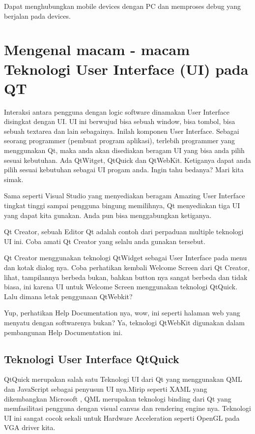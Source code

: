 Dapat menghubungkan mobile devices dengan PC dan memproses debug yang
berjalan pada devices.

\section{Mengenal macam - macam Teknologi User Interface (UI) pada QT}\label{mengenal-macam-macam-teknologi-user-interface-ui-pada-qt}

Interaksi antara pengguna dengan logic software dinamakan User Interface
disingkat dengan UI. UI ini berwujud bisa sebuah window, bisa tombol,
bisa sebuah textarea dan lain sebagainya. Inilah komponen User
Interface. Sebagai seorang programmer (pembuat program aplikasi),
terlebih programmer yang menggunakan Qt, maka anda akan disediakan
beragam UI yang bisa anda pilih sesuai kebutuhan. Ada QtWitget, QtQuick
dan QtWebKit. Ketiganya dapat anda pilih sesuai kebutuhan sebagai UI
progam anda. Ingin tahu bedanya? Mari kita simak.

Sama seperti Visual Studio yang menyediakan beragam Amazing User
Interface tingkat tinggi sampai pengguna bingung memilihnya, Qt
menyediakan tiga UI yang dapat kita gunakan. Anda pun bisa menggabungkan
ketiganya. \smiley

Qt Creator, sebuah Editor Qt adalah contoh dari perpaduan multiple
teknologi UI ini. Coba amati Qt Creator yang selalu anda gunakan
tersebut.

Qt Creator menggunakan teknologi QtWidget sebagai User Interface pada
menu dan kotak dialog nya. Coba perhatikan kembali Welcome Screen dari
Qt Creator, lihat, tampilannya berbeda bukan, bahkan button nya sangat
berbeda dan tidak biasa, ini karena UI untuk Welcome Screen menggunakan
teknologi QtQuick. Lalu dimana letak penggunaan QtWebkit?

Yup, perhatikan Help Documentation nya, wow, ini seperti halaman web
yang menyatu dengan softwarenya bukan? Ya, teknologi QtWebKit digunakan
dalam pembangunan Help Documentation ini.

\subsection{Teknologi User Interface QtQuick}\label{teknologi-user-interface-qtquick}

QtQuick merupakan salah satu Teknologi UI dari Qt yang menggunakan QML
dan JavaScript sebagai penyusun UI nya.Mirip seperti XAML yang
dikembangkan Microsoft , QML merupakan teknologi binding dari Qt yang
memfasilitasi pengguna dengan visual canvas dan rendering engine nya.
Teknologi UI ini sangat cocok sekali untuk Hardware Acceleration seperti
OpenGL pada VGA driver kita.

